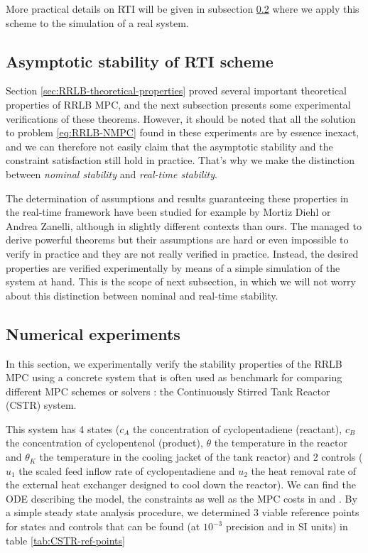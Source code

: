 \documentclass[12pt]{article}
\begin{document}
More practical details on RTI will be given in subsection \ref{sec:RRLB-numerical-experiments} where we apply this scheme to the simulation of a real system.

\subsection{Asymptotic stability of RTI scheme}\label{sec:RRLB-real-time-stability}

Section \ref{sec:RRLB-theoretical-properties} proved several important theoretical properties of RRLB MPC, and the next subsection presents some experimental verifications of these theorems.
However, it should be noted that all the solution to problem \ref{eq:RRLB-NMPC} found in these experiments are by essence inexact, and we can therefore not easily claim that the asymptotic stability and the constraint satisfaction still hold in practice. That's why we make the distinction between \textit{nominal stability} and \textit{real-time stability}.

The determination of assumptions and results guaranteeing these properties in the real-time framework have been studied for example by Mortiz Diehl or Andrea Zanelli, although in slightly different contexts than ours.
The managed to derive powerful theorems but their assumptions are hard or even impossible to verify in practice and they are not really verified in practice.
Instead, the desired properties are verified experimentally by means of a simple simulation of the system at hand.
This is the scope of next subsection, in which we will not worry about this distinction between nominal and real-time stability.


\subsection{Numerical experiments}\label{sec:RRLB-numerical-experiments}

In this section, we experimentally verify the stability properties of the RRLB MPC using a concrete system that is often used as benchmark for comparing different MPC schemes or solvers : the Continuously Stirred Tank Reactor (CSTR) system.


This system has 4 states ($c_A$ the concentration of cyclopentadiene (reactant), $c_B$ the concentration of cyclopentenol (product), $\theta$ the temperature in the reactor and $\theta_K$ the temperature in the cooling jacket of the tank reactor) and 2 controls ($u_1$ the scaled feed inflow rate of cyclopentadiene and $u_2$ the heat removal rate of the external heat exchanger designed to cool down the reactor).
We can find the ODE describing the model, the constraints as well as the MPC costs in \cite{diehl-dissertation} and \cite{cstr-ref}.
By a simple steady state analysis procedure, we determined 3 viable reference points for states and controls that can be found (at $10^{-3}$ precision and in SI units) in table \ref{tab:CSTR-ref-points}
\end{document}
